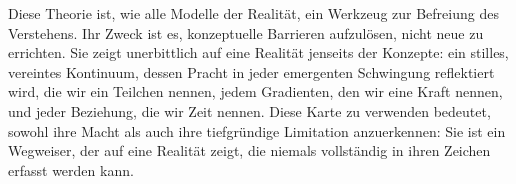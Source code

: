 	\begin{philosophical}
		Diese Theorie ist, wie alle Modelle der Realität, ein Werkzeug zur Befreiung des Verstehens. Ihr Zweck ist es, konzeptuelle Barrieren aufzulösen, nicht neue zu errichten. Sie zeigt unerbittlich auf eine Realität jenseits der Konzepte: ein stilles, vereintes Kontinuum, dessen Pracht in jeder emergenten Schwingung reflektiert wird, die wir ein Teilchen nennen, jedem Gradienten, den wir eine Kraft nennen, und jeder Beziehung, die wir Zeit nennen. Diese Karte zu verwenden bedeutet, sowohl ihre Macht als auch ihre tiefgründige Limitation anzuerkennen: Sie ist ein Wegweiser, der auf eine Realität zeigt, die niemals vollständig in ihren Zeichen erfasst werden kann.
	\end{philosophical}
